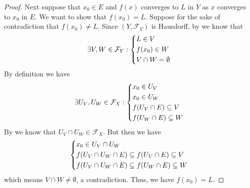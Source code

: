 \begin{proof}
  Next suppose that \(x_0 \in E\) and \(f(x)\) converges to \(L\) in \(Y\) as \(x\) converges to \(x_0\) in \(E\).
  We want to show that \(f(x_0) = L\).
  Suppose for the sake of contradiction that \(f(x_0) \neq L\).
  Since \((Y, \mathcal{F}_Y)\) is Hausdorff, by  we know that
  \[
    \exists V, W \in \mathcal{F}_Y : \begin{dcases}
      L \in V      \\
      f(x_0) \in W \\
      V \cap W = \emptyset
    \end{dcases}
  \]
  By definition we have
  \[
    \exists U_V, U_W \in \mathcal{F}_X : \begin{dcases}
      x_0 \in U_V               \\
      x_0 \in U_W               \\
      f(U_V \cap E) \subseteq V \\
      f(U_W \cap E) \subseteq W
    \end{dcases}
  \]
  By  we know that \(U_V \cap U_W \in \mathcal{F}_X\).
  But then we have
  \[
    \begin{dcases}
      x_0 \in U_V \cap U_W                                       \\
      f(U_V \cap U_W \cap E) \subseteq f(U_V \cap E) \subseteq V \\
      f(U_V \cap U_W \cap E) \subseteq f(U_W \cap E) \subseteq W
    \end{dcases}
  \]
  which means \(V \cap W \neq \emptyset\), a contradiction.
  Thus, we have \(f(x_0) = L\).


\end{proof}
